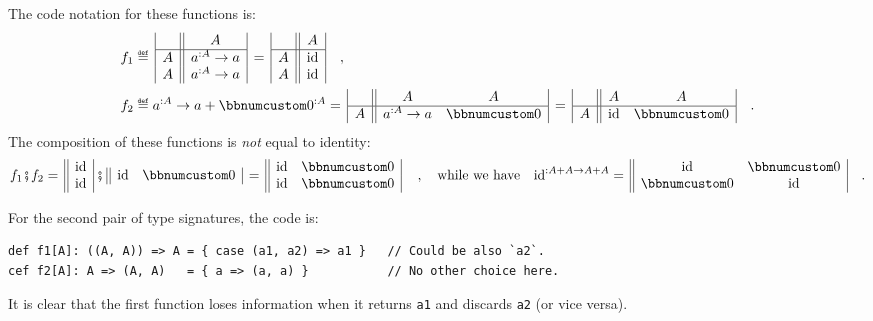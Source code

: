 The code notation for these functions is:
\begin{align*}
f_{1} & \triangleq\,\begin{array}{|c||c|}
 & A\\
\hline A & a^{:A}\rightarrow a\\
A & a^{:A}\rightarrow a
\end{array}\,=\,\begin{array}{|c||c|}
 & A\\
\hline A & \text{id}\\
A & \text{id}
\end{array}\quad,\\
f_{2} & \triangleq a^{:A}\rightarrow a+\bbnum 0^{:A}=\,\begin{array}{|c||cc|}
 & A & A\\
\hline A & a^{:A}\rightarrow a & \bbnum 0
\end{array}\,=\,\begin{array}{|c||cc|}
 & A & A\\
\hline A & \text{id} & \bbnum 0
\end{array}\quad.
\end{align*}
The composition of these functions is \emph{not} equal to identity:
\[
f_{1}\bef f_{2}=\,\begin{array}{||c|}
\text{id}\\
\text{id}
\end{array}\,\bef\,\begin{array}{||cc|}
\text{id} & \bbnum 0\end{array}\,=\,\begin{array}{||cc|}
\text{id} & \bbnum 0\\
\text{id} & \bbnum 0
\end{array}\,\quad,\quad\text{while we have}\quad\text{id}^{:A+A\rightarrow A+A}=\,\begin{array}{||cc|}
\text{id} & \bbnum 0\\
\bbnum 0 & \text{id}
\end{array}\quad.
\]

For the second pair of type signatures, the code is:
\begin{lstlisting}
def f1[A]: ((A, A)) => A = { case (a1, a2) => a1 }   // Could be also `a2`.
cef f2[A]: A => (A, A)   = { a => (a, a) }           // No other choice here.
\end{lstlisting}
It is clear that the first function loses information when it returns
\lstinline!a1! and discards \lstinline!a2! (or vice versa).

